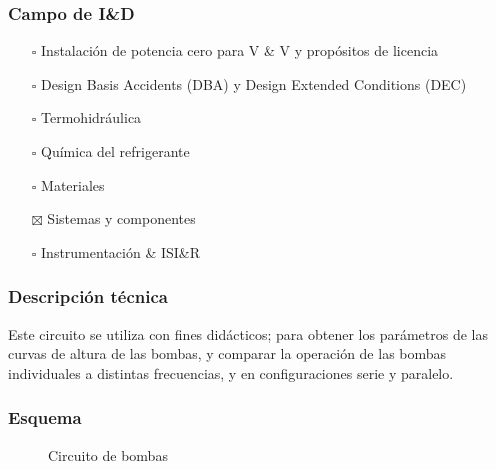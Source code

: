 \documentclass{article}
\begin{document}
\subsubsection*{Campo de I\&D}
\begin{itemize}
\item[$\square$] Instalación de potencia cero para V \& V y propósitos de licencia
\item[$\square$] Design Basis Accidents (DBA) y Design Extended Conditions (DEC)
\item[$\square$] Termohidráulica
\item[$\square$] Química del refrigerante
\item[$\square$] Materiales
\item[$\boxtimes$] Sistemas y componentes
\item[$\square$] Instrumentación \& ISI\&R
\end{itemize}
\subsubsection*{Descripción técnica}
Este circuito se utiliza con fines didácticos; para obtener los parámetros de las curvas de altura de las bombas, y comparar la operación de las bombas individuales a distintas frecuencias, y en configuraciones serie y paralelo.
\subsubsection*{Esquema}
\begin{figure}[H]
\begin{center}
\end{center}
\caption{Circuito de bombas}
\end{figure}
\end{document}

